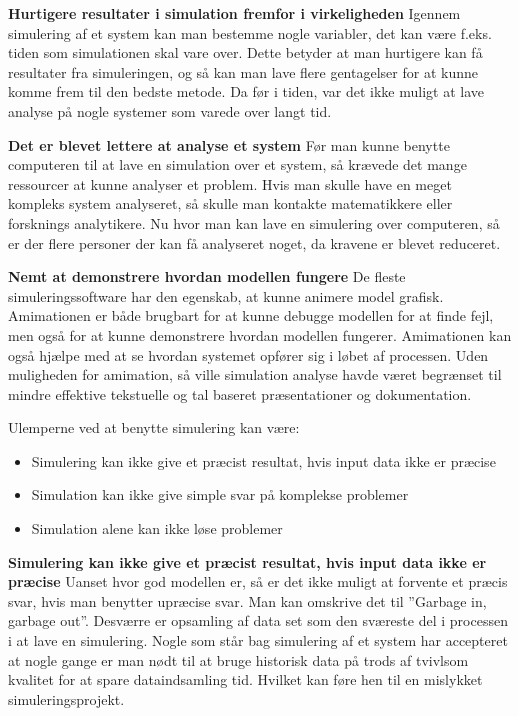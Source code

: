 \textbf{Hurtigere resultater i simulation fremfor i virkeligheden}
Igennem simulering af et system kan man bestemme nogle variabler, det kan være f.eks. tiden som simulationen skal vare over. Dette betyder at man hurtigere kan få resultater fra simuleringen, og så kan man lave flere gentagelser for at kunne komme frem til den bedste metode. Da før i tiden, var det ikke muligt at lave analyse på nogle systemer som varede over langt tid.

\vspace{5mm}

\textbf{Det er blevet lettere at analyse et system}
Før man kunne benytte computeren til at lave en simulation over et system, så krævede det mange ressourcer at kunne analyser et problem. Hvis man skulle have en meget kompleks system analyseret, så skulle man kontakte matematikkere eller forsknings analytikere. Nu hvor man kan lave en simulering over computeren, så er der flere personer der kan få analyseret noget, da kravene er blevet reduceret.

\vspace{5mm}

\textbf{Nemt at demonstrere hvordan modellen fungere}
 De fleste simuleringssoftware har den egenskab, at kunne animere model grafisk. Amimationen er både brugbart for at kunne debugge modellen for at finde fejl, men også for at kunne demonstrere hvordan modellen fungerer. Amimationen kan også hjælpe med at se hvordan systemet opfører sig i løbet af processen. Uden muligheden for amimation, så ville simulation analyse havde været begrænset til mindre effektive tekstuelle og tal baseret præsentationer og dokumentation.

\vspace{5mm}
Ulemperne ved at benytte simulering kan være:
\begin{itemize}
\item Simulering kan ikke give et præcist resultat, hvis input data ikke er præcise
\item Simulation kan ikke give simple svar på komplekse problemer
\item Simulation alene kan ikke løse problemer
\end{itemize}

\vspace{5mm}

\textbf{Simulering kan ikke give et præcist resultat, hvis input data ikke er præcise}
Uanset hvor god modellen er, så er det ikke muligt at forvente et præcis svar, hvis man benytter upræcise svar. Man kan omskrive det til ”Garbage in, garbage out”. Desværre er opsamling af data set som den sværeste del i processen i at lave en simulering. Nogle som står bag simulering af et system har accepteret at nogle gange er man nødt til at bruge historisk data på trods af tvivlsom kvalitet for at spare dataindsamling tid. Hvilket kan føre hen til en mislykket simuleringsprojekt.

